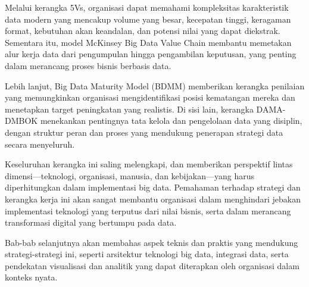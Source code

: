 Melalui kerangka 5Vs, organisasi dapat memahami kompleksitas karakteristik data modern yang mencakup volume yang besar, kecepatan tinggi, keragaman format, kebutuhan akan keandalan, dan potensi nilai yang dapat diekstrak. Sementara itu, model McKinsey Big Data Value Chain membantu memetakan alur kerja data dari pengumpulan hingga pengambilan keputusan, yang penting dalam merancang proses bisnis berbasis data.

Lebih lanjut, Big Data Maturity Model (BDMM) memberikan kerangka penilaian yang memungkinkan organisasi mengidentifikasi posisi kematangan mereka dan menetapkan target peningkatan yang realistis. Di sisi lain, kerangka DAMA-DMBOK menekankan pentingnya tata kelola dan pengelolaan data yang disiplin, dengan struktur peran dan proses yang mendukung penerapan strategi data secara menyeluruh.

Keseluruhan kerangka ini saling melengkapi, dan memberikan perspektif lintas dimensi—teknologi, organisasi, manusia, dan kebijakan—yang harus diperhitungkan dalam implementasi big data. Pemahaman terhadap strategi dan kerangka kerja ini akan sangat membantu organisasi dalam menghindari jebakan implementasi teknologi yang terputus dari nilai bisnis, serta dalam merancang transformasi digital yang bertumpu pada data.

Bab-bab selanjutnya akan membahas aspek teknis dan praktis yang mendukung strategi-strategi ini, seperti arsitektur teknologi big data, integrasi data, serta pendekatan visualisasi dan analitik yang dapat diterapkan oleh organisasi dalam konteks nyata.


